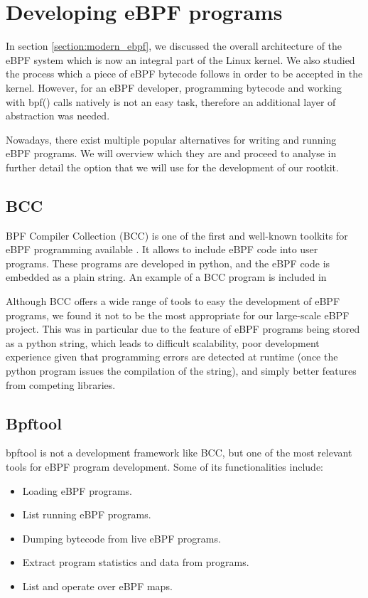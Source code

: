 \section{Developing eBPF programs}
In section \ref{section:modern_ebpf}, we discussed the overall architecture of the eBPF system which is now an integral part of the Linux kernel. We also studied the process which a piece of eBPF bytecode follows in order to be accepted in the kernel. However, for an eBPF developer, programming bytecode and working with bpf() calls natively is not an easy task, therefore an additional layer of abstraction was needed. 

Nowadays, there exist multiple popular alternatives for writing and running eBPF programs. We will overview which they are and proceed to analyse in further detail the option that we will use for the development of our rootkit.

\subsection{BCC}
BPF Compiler Collection (BCC) is one of the first and well-known toolkits for eBPF programming available \cite{bcc_github}. It allows to include eBPF code into user programs. These programs are developed in python, and the eBPF code is embedded as a plain string. An example of a BCC program is included in %

Although BCC offers a wide range of tools to easy the development of eBPF programs, we found it not to be the most appropriate for our large-scale eBPF project. This was in particular due to the feature of eBPF programs being stored as a python string, which leads to difficult scalability, poor development experience given that programming errors are detected at runtime (once the python program issues the compilation of the string), and simply better features from competing libraries.

\subsection{Bpftool}
bpftool is not a development framework like BCC, but one of the most relevant tools for eBPF program development. Some of its functionalities include:
\begin{itemize}
\item Loading eBPF programs.
\item List running eBPF programs.
\item Dumping bytecode from live eBPF programs.
\item Extract program statistics and data from programs.
\item List and operate over eBPF maps.
\end{itemize}

